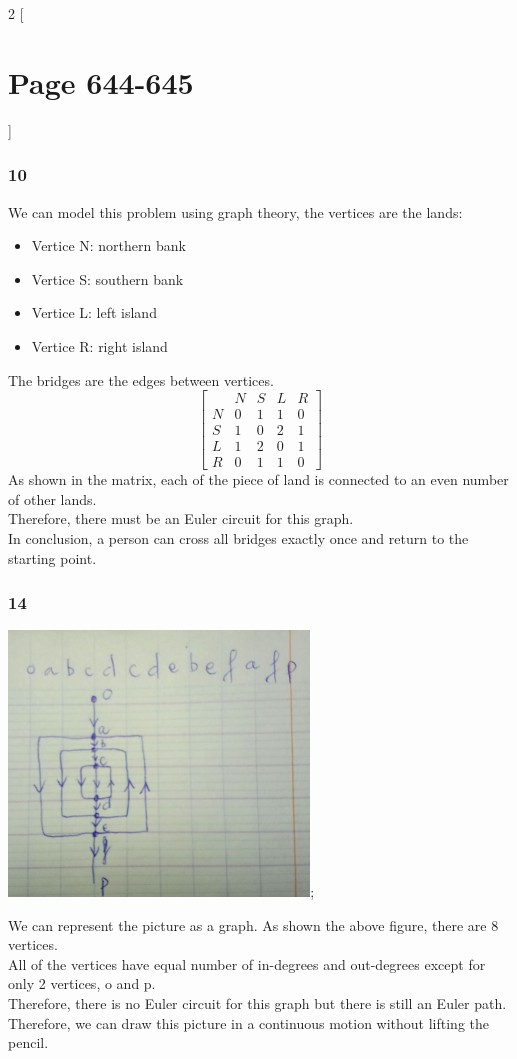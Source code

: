 \documentclass[12pt]{article}
\begin{document}
  \begin{multicols}{2}
    [\part*{Page 644-645}]
    \section*{10}
      We can model this problem using graph theory, the vertices are the lands:
      \begin{itemize}
        \item Vertice N: northern bank
        \item Vertice S: southern bank
        \item Vertice L: left island
        \item Vertice R: right island
      \end{itemize}
      The bridges are the edges between vertices.
      \[
      \left[\begin{matrix}
          &N &S &L &R \\
        N &0 &1 &1 &0 \\
        S &1 &0 &2 &1 \\
        L &1 &2 &0 &1 \\
        R &0 &1 &1 &0
      \end{matrix}\right]
      \]
      As shown in the matrix, each of the piece of land is connected to an even number of other lands.\\
      Therefore, there must be an Euler circuit for this graph.\\
      In conclusion, a person can cross all bridges exactly once and return to the starting point.
    \section*{14}
      \begin{center}
        \includegraphics[width=8cm]{14.jpg};
      \end{center}
      We can represent the picture as a graph. As shown the above figure, there are 8 vertices.\\
      All of the vertices have equal number of in-degrees and out-degrees except for only 2 vertices, o and p. \\
      Therefore, there is no Euler circuit for this graph but there is still an Euler path.\\
      Therefore, we can draw this picture in a continuous motion without lifting the pencil.

\end{multicols}
\end{document}
